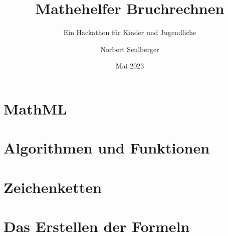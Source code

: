 \documentclass[12p,numbers=noendperiod,DIV=15]{scrreprt}
\begin{document}
	
\title{Mathehelfer Bruchrechnen}
\subtitle{Ein Hackathon für Kinder und Jugendliche}
\author{Norbert Seulberger}
\date{Mai 2023}

\maketitle

\tableofcontents

%
%
%
%
%
%

\chapter{MathML}




\chapter{Algorithmen und Funktionen}








\chapter{Zeichenketten}



\chapter{Das Erstellen der Formeln}





%
%
%
%
%
%
%

%
%
%
%
\end{document}
